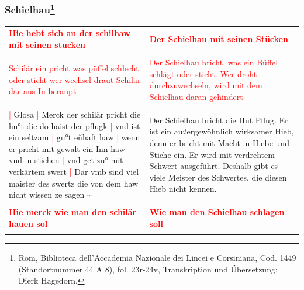 \newpage

\begin{center}
\end{center}

\newpage

\subsubsection[Schielhau]{
    Schielhau\footnote{
        \hspace*{0.5ex}Rom, Biblioteca dell'Accademia Nazionale dei Lincei e Corsiniana,
        Cod. 1449 (Standortnummer 44 A 8), fol. 23r-24v, Transkription und Übersetzung: Dierk Hagedorn.}}

\begin{longtable}{p{6.25cm}p{6.25cm}}
    \textbf{\textcolor{red}{
        Hie hebt sich an der schilhaw mit seinen stucken}}
    &
    \textbf{\textcolor{red}{
        Der Schielhau mit seinen Stücken}}
    \\
    \\
    \textcolor{red}{
        Schilär ein pricht was püffel schlecht oder sticht
        wer wechsel draut Schilär dar aus In beraupt}
    &
    \textcolor{red}{
        Der Schielhau bricht, was ein Büffel schlägt oder sticht.
        Wer droht durchzuwechseln, wird mit dem Schielhau daran gehindert.}
    \\
    \\
    \textcolor{red}{|} Glosa
    \textcolor{red}{|} Merck der schilär pricht die hu°t die do haist der pflugk
    \textcolor{red}{|} vnd ist ein seltzam
    \textcolor{red}{|} gu°t eñhaft haw
    \textcolor{red}{|} wenn er pricht mit gewalt ein Inn haw
    \textcolor{red}{|} vnd in stichen
    \textcolor{red}{|} vnd get zu° mit verkärtem swert
    \textcolor{red}{|} Dar vmb sind viel maister des swertz die von dem haw nicht wissen ze sagen \textcolor{red}{\textasciitilde{}}
    &
    Der Schielhau bricht die Hut Pflug.
    Er ist ein außergewöhnlich wirksamer Hieb, denn er bricht mit Macht in Hiebe und Stiche ein.
    Er wird mit verdrehtem Schwert ausgeführt.
    Deshalb gibt es viele Meister des Schwertes, die diesen Hieb nicht kennen.
    \\
    \\
    \textbf{\textcolor{red}{
        Hie merck wie man den schilär hauen sol}}
    &
    \textbf{\textcolor{red}{
        Wie man den Schielhau schlagen soll}}
    \\
    \\

\end{longtable}
